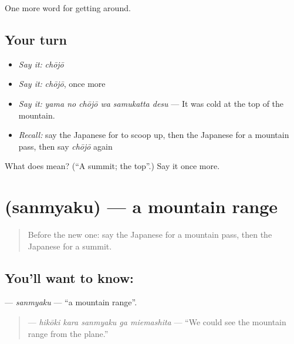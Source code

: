 \begin{grammarlens}[title={What you've built}]
One more word for getting around.
\end{grammarlens}

\subsection*{Your turn}
\begin{itemize}
\raggedright
  \item \emph{Say it:} \emph{chōjō}
  \item \emph{Say it:} \emph{chōjō}, once more
  \item \emph{Say it:} \emph{yama no chōjō wa samukatta desu} — It was cold at the top of the mountain.
  \item \emph{Recall:} say the Japanese for to scoop up, then the Japanese for a mountain pass, then say \emph{chōjō} again
\end{itemize}

\begin{tcolorbox}[breakable,colback=teal!4,colframe=teal!35!black,title={Before you move on}]
What does  mean? (\textquotedblleft{}A summit; the top\textquotedblright{}.) Say it once more.
\end{tcolorbox}
\section[\texorpdfstring{\ja{さんみゃく} (sanmyaku)}{さんみゃく (sanmyaku)}]{ (sanmyaku) — a mountain range}

\label{lesson:JA-C412-sanmyaku}



\begin{quote}
Before the new one: say the Japanese for a mountain pass, then the Japanese for a summit.
\end{quote}

\subsection*{You'll want to know: }
\textbf{} — \emph{sanmyaku} — \textquotedblleft{}a mountain range\textquotedblright{}.

\begin{quote}
\textbf{  } — \emph{hikōki kara sanmyaku ga miemashita} — \textquotedblleft{}We could see the mountain range from the plane.\textquotedblright{}
\end{quote}

